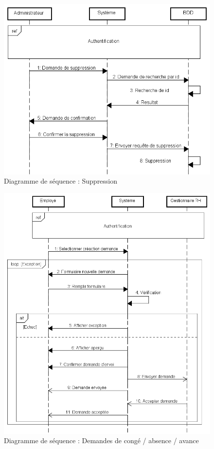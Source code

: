 \begin{figure}[h]
	\centering
	\includegraphics[width=1\linewidth]{"Chapitre3/images/sd/Suppression"}
	\caption{Diagramme de séquence : Suppression}
	\label{Diagramme de séquence : Suppression}
\end{figure}

\begin{figure}[h]
	\centering
	\includegraphics[width=1\linewidth]{"Chapitre3/images/sd/Demandes"}
	\caption{Diagramme de séquence : Demandes de congé / absence / avance}
	\label{Diagramme de séquence : Demandes de congé / absence / avance}
\end{figure}

